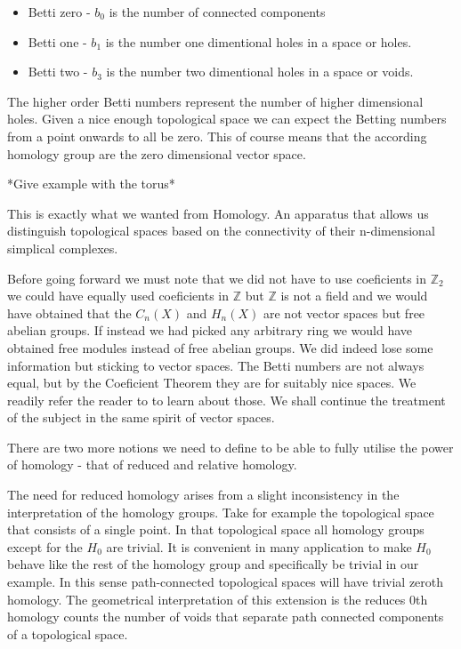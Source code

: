 \begin{itemize}
    \item Betti zero - $b_0$ is the number of connected components
    \item Betti one - $b_1$ is the number one dimentional holes in a space or holes.
    \item Betti two - $b_3$ is the number two dimentional holes in a space or voids.
\end{itemize}


The higher order Betti numbers represent the number of higher dimensional holes. Given a nice enough topological space we can expect the Betting numbers from a point onwards to all be zero. This of course means that the according homology group are the zero dimensional vector space.

*Give example with the torus*

This is exactly what we wanted from Homology. An apparatus that allows us distinguish topological spaces based on the connectivity of their n-dimensional simplical complexes.

Before going forward we must note that we did not have to use coeficients in $\mathbb{Z}_2$ we could have equally used coeficients in $\mathbb{Z}$ but $\mathbb{Z}$ is not a field and we would have obtained that the $C_n(X)$ and $H_n(X)$ are not vector spaces but free abelian groups. If instead we had picked any arbitrary ring we would have obtained free modules instead of free abelian groups. We did indeed lose some information but sticking to vector spaces. The Betti numbers are not always equal, but by the Coeficient Theorem they are for suitably nice spaces. We readily refer the reader to \cite{algebraic-topology} to learn about those. We shall continue the treatment of the subject in the same spirit of vector spaces.

There are two more notions we need to define to be able to fully utilise the power of homology - that of reduced and relative homology.

The need for reduced homology arises from a slight inconsistency in the interpretation of the homology groups. Take for example the topological space that consists of a single point. In that topological space all homology groups except for the $H_0$ are trivial. It is convenient in many application to make $H_0$ behave like the rest of the homology group and specifically be trivial in our example. In this sense path-connected topological spaces will have trivial zeroth homology. The geometrical interpretation of this extension is the reduces 0th homology counts the number of voids that separate path connected components of a topological space.

